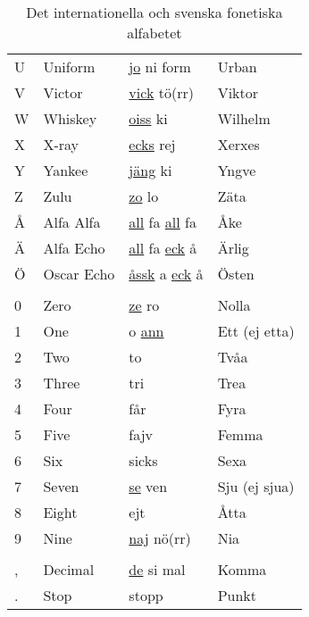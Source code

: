\begin{table}[htbp]
\begin{tabular}{llll}
    U & Uniform    & \underline{jo} ni form                & Urban           \\
    V & Victor     & \underline{vick} tö(rr)               & Viktor          \\
    W & Whiskey    & \underline{oiss} ki                   & Wilhelm         \\
    X & X-ray      & \underline{ecks} rej                  & Xerxes          \\
    Y & Yankee     & \underline{jäng} ki                   & Yngve           \\
    Z & Zulu       & \underline{zo} lo                     & Zäta            \\
    Å & Alfa Alfa  & \underline{all} fa \underline{all} fa & Åke             \\
    Ä & Alfa Echo  & \underline{all} fa \underline{eck} å  & Ärlig           \\
    Ö & Oscar Echo & \underline{åssk} a \underline{eck} å  & Östen           \\
      &            &                                                         \\
    0 & Zero       & \underline{ze} ro                     & Nolla           \\
    1 & One        & o \underline{ann}                     & Ett (ej etta) \\
    2 & Two        & to                                    & Tvåa            \\
    3 & Three      & tri                                   & Trea            \\
    4 & Four       & får                                   & Fyra            \\
    5 & Five       & fajv                                  & Femma           \\
    6 & Six        & sicks                                 & Sexa            \\
    7 & Seven      & \underline{se} ven                    & Sju (ej sjua) \\
    8 & Eight      & ejt                                   & Åtta            \\
    9 & Nine       & \underline{naj} nö(rr)                & Nia             \\
      &            &                                                         \\
    , & Decimal    & \underline{de} si mal                 & Komma           \\
    . & Stop       & stopp                                 & Punkt           \\
  \end{tabular}
	\caption{Det internationella och svenska fonetiska alfabetet}
  	\label{tab:bokstavering-internationell}
	\label{tab:bokstavering-svenska}
\end{table}
